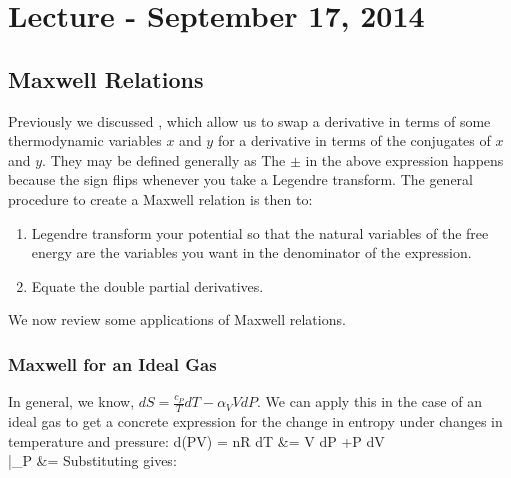 \documentclass[12pt]{article}
\begin{document}
\section{Lecture - September 17, 2014}
\subsection{Maxwell Relations}
Previously we discussed , which allow us to swap a derivative in terms of some thermodynamic variables $x$ and $y$ for a derivative in terms of the conjugates of $x$ and $y$. They may be defined generally as
\eqs {}
\eqe
The $ \pm $ in the above expression happens because the sign flips whenever you take a Legendre transform. The general procedure to create a Maxwell relation is then to: 
\begin{enumerate}
\item Legendre transform your potential so that the natural variables of the free energy are the variables you want in the denominator of the expression.
\item Equate the double partial derivatives.
\end{enumerate}
We now review some applications of Maxwell relations. 
\subsubsection{Maxwell for an Ideal Gas}
In general, we know, $dS = \frac{c_P}{T}dT - \alpha_V V dP$. We can apply this in the case of an ideal gas to get a concrete expression for the change in entropy under changes in temperature and pressure:%
\eqs
d(PV) = nR dT &= V dP +P dV\\
|_P &= 
\eqe
Substituting gives: 
\eqs
{}
\eqe
\end{document}
